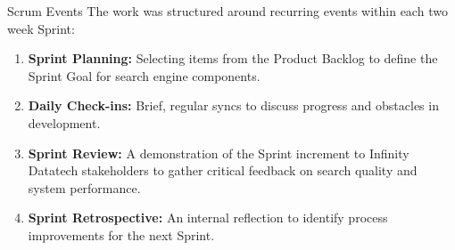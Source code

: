 \begin{frame}{Scrum Events}
The work was structured around recurring events within each two week Sprint:
\begin{enumerate}
\item \textbf{Sprint Planning:} Selecting items from the Product Backlog to define the Sprint Goal for search engine components.
\item \textbf{Daily Check-ins:} Brief, regular syncs to discuss progress and obstacles in development.
\item \textbf{Sprint Review:} A demonstration of the Sprint increment to Infinity Datatech stakeholders to gather critical feedback on search quality and system performance.
\item \textbf{Sprint Retrospective:} An internal reflection to identify process improvements for the next Sprint.
\end{enumerate}
\end{frame}

